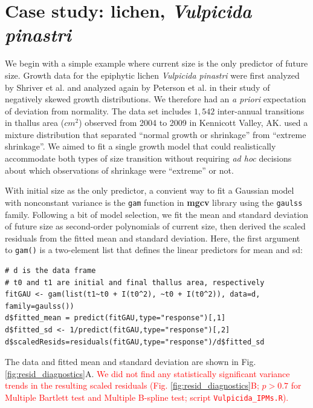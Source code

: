 \documentclass[12pt]{article}
\newcommand{\new}{\textcolor{red}}
\begin{document}
\section{Case study: lichen, \emph{Vulpicida pinastri}}
\label{sec:lichenCaseStudy} 
We begin with a simple example where current size is the only predictor of future size. 
Growth data for the epiphytic lichen \emph{Vulpicida pinastri} were first analyzed by Shriver et al. \citeyear{shriver2012comparative} and analyzed again by Peterson et al. \citeyear{peterson2019improving} in their study of negatively skewed growth distributions. 
We therefore had an \emph{a priori} expectation of deviation from normality. 
The data set includes $1,542$ inter-annual transitions in thallus area ($cm^2$) observed from 2004 to 2009 in Kennicott Valley, AK. 
\citeyear{shriver2012comparative} used a mixture distribution that separated ``normal growth or shrinkage'' from ``extreme shrinkage''. 
We aimed to fit a single growth model that could realistically accommodate both types of size transition without requiring \emph{ad hoc} decisions about which observations of shrinkage were ``extreme'' or not.

With initial size as the only predictor, a convient way to fit a Gaussian model with nonconstant variance is the \texttt{gam} function in \textbf{mgcv} library \citep{wood-2017} using the \texttt{gaulss} family. 
Following a bit of model selection, we fit the mean and standard deviation of future size as second-order polynomials of current size, then derived the scaled residuals from the fitted mean and standard deviation.
Here, the first argument to \texttt{gam()} is a two-element list that defines the linear predictors for mean and sd:
\begin{lstlisting}
# d is the data frame
# t0 and t1 are initial and final thallus area, respectively
fitGAU <- gam(list(t1~t0 + I(t0^2), ~t0 + I(t0^2)), data=d, family=gaulss())
d$fitted_mean = predict(fitGAU,type="response")[,1]
d$fitted_sd <- 1/predict(fitGAU,type="response")[,2]
d$scaledResids=residuals(fitGAU,type="response")/d$fitted_sd
\end{lstlisting}
The data and fitted mean and standard deviation are shown in Fig. \ref{fig:resid_diagnostics}A. \new{We did not find any statistically significant variance trends in the 
resulting scaled residuals (Fig. \ref{fig:resid_diagnostics}B; $p>0.7$ for Multiple Bartlett test and Multiple B-spline test; script \texttt{Vulpicida\_IPMs.R}).} 
\end{document}
